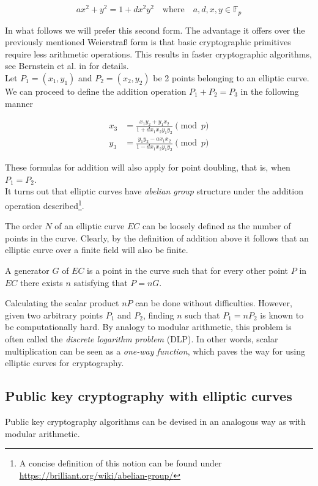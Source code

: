 \[a x^2 + y^2 = 1 + d x^2 y^2 \quad \textrm{where} \quad a, d, x, y \in \mathbb{F}_p \]


In what follows we will prefer this second form. The advantage it offers over the previously mentioned Weierstraß form is that basic cryptographic primitives require less arithmetic operations. This results in faster cryptographic algorithms, see Bernstein et al. in \cite{Bernstein2007} for details.
\\

Let \(P_1 = (x_1, y_1)\) and \(P_2 = (x_2, y_2)\) be 2 points belonging to an elliptic curve. We can proceed to define the addition operation \(P_1 + P_2 = P_3\) in the following manner

\begin{align*}
x_3 & =  \frac{x_1 y_2 + y_1 x_ 2}{1 + d x_1 x_2 y_1 y_2}  \pmod p \\
y_3 & =  \frac{y_1 y_2 - a x_1 x_2}{1 - d x_1 x_2 y_1 y_2} \pmod p 
\end{align*}

These formulas for addition will also apply for point doubling, that is, when \(P_1 = P_2\).
\\

It turns out that elliptic curves have {\em abelian group} structure under the addition operation described\footnote{
A concise definition of this notion can be found under \url{https://brilliant.org/wiki/abelian-group/}}.


The order \(N\) of an elliptic curve \(EC\) can be loosely defined as the number of points in the curve. Clearly, by the definition of addition above it follows that an elliptic curve over a finite field will also be finite.  


A generator \(G\) of \(EC\) is a point in the curve such that for every other point \(P\) in \(EC\) there exists \(n\) satisfying that \(P = n G\).

Calculating the scalar product \(n P\) can be done without difficulties. However, given two arbitrary points \(P_1\) and \(P_2\), finding \(n\) such that \(P_1 = n P_2\) is known to be computationally hard. By analogy to modular arithmetic, this problem is often called the {\em discrete logarithm problem} (DLP). In other words, scalar multiplication can be seen as a {\em one-way function}, which paves the way
for using elliptic curves for cryptography. 


\subsection{Public key cryptography with elliptic curves}
\label{ec:keys}
Public key cryptography algorithms can be devised in an analogous way as with modular arithmetic. 

